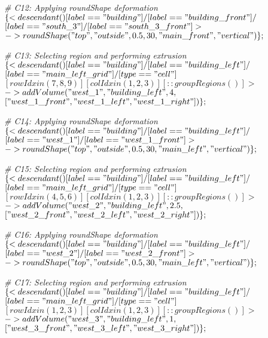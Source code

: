 \noindent \textit{\# C12: Applying roundShape deformation}\\
$\{< descendant() [label=="building"] / [label=="building\_front"] / $\\
$[label=="south\_3"] / [label=="south\_3\_front"] > $\\
$-> roundShape("top", "outside", 0.5, 30, "main\_front", "vertical")\};$

\noindent \textit{\# C13: Selecting region and performing extrusion}\\
$\{< descendant() [label=="building"] / [label=="building\_left"] / $\\
$[label=="main\_left\_grid"] / [type=="cell"] $\\
$[rowIdx in (7, 8, 9)] [colIdx in (1, 2, 3)] [::groupRegions()] > $\\
$-> addVolume("west\_1", "building\_left", 4, $\\
$["west\_1\_front", "west\_1\_left", "west\_1\_right"])\};$

\noindent \textit{\# C14: Applying roundShape deformation}\\
$\{< descendant() [label=="building"] / [label=="building\_left"] / $\\
$[label=="west\_1"] / [label=="west\_1\_front"] > $\\
$-> roundShape("top", "outside", 0.5, 30, "main\_left", "vertical")\};$

\noindent \textit{\# C15: Selecting region and performing extrusion}\\
$\{< descendant() [label=="building"] / [label=="building\_left"] / $\\
$[label=="main\_left\_grid"] / [type=="cell"] $\\
$[rowIdx in (4, 5, 6)] [colIdx in (1, 2, 3)] [::groupRegions()] > $\\
$-> addVolume("west\_2", "building\_left", 2.5, $\\
$["west\_2\_front", "west\_2\_left", "west\_2\_right"])\};$

\noindent \textit{\# C16: Applying roundShape deformation}\\
$\{< descendant() [label=="building"] / [label=="building\_left"] / $\\
$[label=="west\_2"] / [label=="west\_2\_front"] > $\\
$-> roundShape("top", "outside", 0.5, 30, "main\_left", "vertical")\};$

\noindent \textit{\# C17: Selecting region and performing extrusion}\\
$\{< descendant() [label=="building"] / [label=="building\_left"] / $\\
$[label=="main\_left\_grid"] / [type=="cell"] $\\
$[rowIdx in (1, 2, 3)] [colIdx in (1, 2, 3)] [::groupRegions()] > $\\
$-> addVolume("west\_3", "building\_left", 1, $\\
$["west\_3\_front", "west\_3\_left", "west\_3\_right"])\};$

